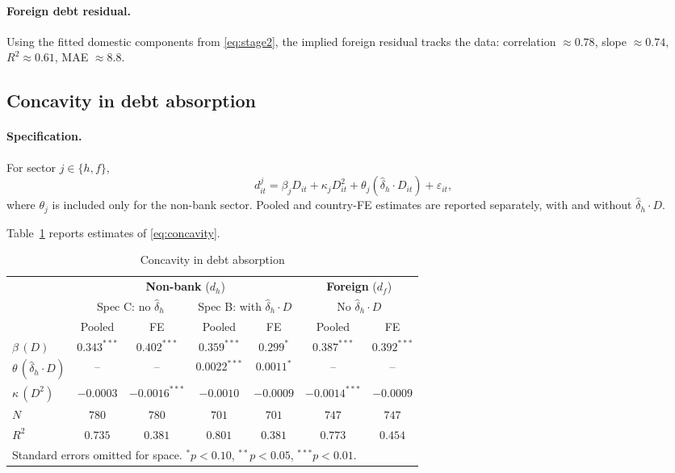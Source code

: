\documentclass[\latexroot/\projectname]{subfiles}
\begin{document}
\paragraph{Foreign debt residual.}
Using the fitted domestic components from \eqref{eq:stage2}, the
implied foreign residual tracks the data: correlation
$\approx 0.78$, slope $\approx 0.74$, $R^2\approx 0.61$, MAE
$\approx 8.8$.

\subsection{Concavity in debt absorption}

\paragraph{Specification.}
For sector $j\in\{h,f\}$,
\begin{equation}\label{eq:concavity}
d^j_{it}=\beta_j D_{it}+\kappa_j D_{it}^2
        +\theta_j(\hat\delta_h\!\cdot D_{it})+\varepsilon_{it},
\end{equation}
where $\theta_j$ is included only for the non-bank sector. Pooled and
country-FE estimates are reported separately, with and without
$\hat\delta_h\!\cdot D$.

Table~\ref{tab:concavity} reports estimates of \eqref{eq:concavity}.

\begin{table}[htbp]\centering
\caption{Concavity in debt absorption}
\label{tab:concavity}
\setlength{\tabcolsep}{6pt}
\renewcommand{\arraystretch}{1.15}
\begin{tabular}{lcccccc}
\toprule
& \multicolumn{4}{c}{\textbf{Non-bank} ($d_h$)}
& \multicolumn{2}{c}{\textbf{Foreign} ($d_f$)} \\
\cmidrule(lr){2-5}\cmidrule(lr){6-7}
& \multicolumn{2}{c}{Spec C: no $\hat\delta_h$}
& \multicolumn{2}{c}{Spec B: with $\hat\delta_h\!\cdot D$}
& \multicolumn{2}{c}{No $\hat\delta_h\!\cdot D$} \\
\cmidrule(lr){2-3}\cmidrule(lr){4-5}\cmidrule(lr){6-7}
& Pooled & FE & Pooled & FE & Pooled & FE \\
\midrule
$\beta\,(D)$
& $0.343^{***}$ & $0.402^{***}$ & $0.359^{***}$ & $0.299^{*}$
& $0.387^{***}$ & $0.392^{***}$ \\
$\theta\,(\hat\delta_h\!\cdot D)$
& -- & -- & $0.0022^{***}$ & $0.0011^{*}$
& -- & -- \\
$\kappa\,(D^2)$
& $-0.0003$ & $-0.0016^{***}$ & $-0.0010$ & $-0.0009$
& $-0.0014^{***}$ & $-0.0009$ \\
\midrule
$N$   & $780$ & $780$ & $701$ & $701$ & $747$ & $747$ \\
$R^2$ & $0.735$ & $0.381$ & $0.801$ & $0.381$ & $0.773$ & $0.454$ \\
\bottomrule
\multicolumn{7}{p{0.95\linewidth}}{\footnotesize Standard errors omitted for space. $^{*}p<0.10$, $^{**}p<0.05$, $^{***}p<0.01$.}
\end{tabular}
\end{table}
\end{document}
